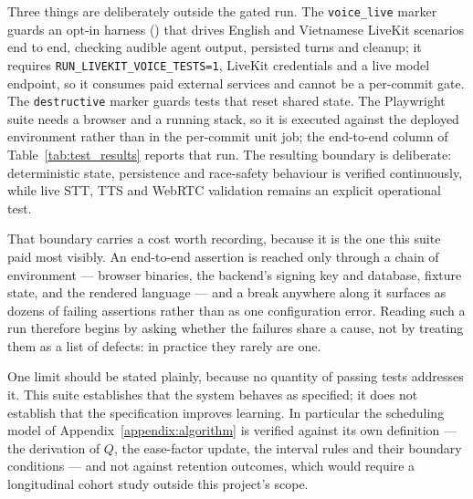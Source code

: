 Three things are deliberately outside the gated run. The \texttt{voice\_live}
marker guards an opt-in harness
() that drives English and
Vietnamese LiveKit scenarios end to end, checking audible agent output,
persisted turns and cleanup; it requires \texttt{RUN\_LIVEKIT\_VOICE\_TESTS=1},
LiveKit credentials and a live model endpoint, so it consumes paid external
services and cannot be a per-commit gate. The \texttt{destructive} marker
guards tests that reset shared state. The Playwright suite needs a browser and a
running stack, so it is executed against the deployed environment rather than in
the per-commit unit job; the end-to-end column of
Table~\ref{tab:test_results} reports that run. The resulting boundary is
deliberate: deterministic state, persistence and race-safety behaviour is
verified continuously, while live STT, TTS and WebRTC validation remains an
explicit operational test.

That boundary carries a cost worth recording, because it is the one this suite
paid most visibly. An end-to-end assertion is reached only through a chain of
environment --- browser binaries, the backend's signing key and database,
fixture state, and the rendered language --- and a break anywhere along it
surfaces as dozens of failing assertions rather than as one configuration
error. Reading such a run therefore begins by asking whether the failures share
a cause, not by treating them as a list of defects: in practice they rarely
are one.

One limit should be stated plainly, because no quantity of passing tests
addresses it. This suite establishes that the system behaves as specified; it
does not establish that the specification improves learning. In particular the
scheduling model of Appendix~\ref{appendix:algorithm} is verified against its
own definition --- the derivation of $Q$, the ease-factor update, the interval
rules and their boundary conditions --- and not against retention outcomes,
which would require a longitudinal cohort study outside this project's scope.
